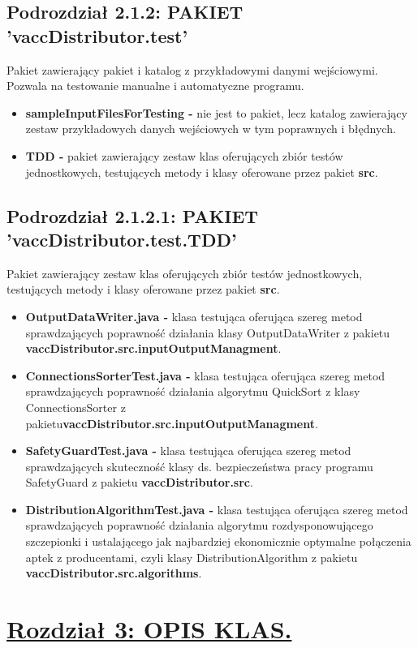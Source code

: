 \documentclass[a4paper]{article}
\begin{document}
\subsection*{Podrozdział 2.1.2: PAKIET 'vaccDistributor.test'}
Pakiet zawierający pakiet i katalog z przykładowymi danymi wejściowymi. Pozwala na testowanie manualne i automatyczne programu.
\begin{itemize}
\item \textbf{sampleInputFilesForTesting -} nie jest to pakiet, lecz katalog zawierający zestaw przykładowych danych wejściowych w tym poprawnych i błędnych.
\item \textbf{TDD -} pakiet zawierający zestaw klas oferujących zbiór testów jednostkowych, testujących metody i klasy oferowane przez pakiet \textbf{src}.
\end{itemize}

\subsection*{Podrozdział 2.1.2.1: PAKIET 'vaccDistributor.test.TDD'}
Pakiet zawierający zestaw klas oferujących zbiór testów jednostkowych, testujących metody i klasy oferowane przez pakiet \textbf{src}.
\begin{itemize}
\item \textbf{OutputDataWriter.java -} klasa testująca oferująca szereg metod sprawdzających poprawność działania klasy OutputDataWriter z pakietu \textbf{vaccDistributor.src.inputOutputManagment}.
\item \textbf{ConnectionsSorterTest.java -} klasa testująca oferująca szereg metod sprawdzających poprawność działania algorytmu QuickSort z klasy ConnectionsSorter z pakietu\newline \textbf{vaccDistributor.src.inputOutputManagment}.
\item \textbf{SafetyGuardTest.java -} klasa testująca oferująca szereg metod sprawdzających skuteczność klasy ds. bezpieczeństwa pracy programu SafetyGuard z pakietu \textbf{vaccDistributor.src}.
\item \textbf{DistributionAlgorithmTest.java -} klasa testująca oferująca szereg metod sprawdzających poprawność działania algorytmu rozdysponowującego szczepionki i ustalającego jak najbardziej ekonomicznie optymalne połączenia aptek z producentami, czyli klasy DistributionAlgorithm z pakietu \textbf{vaccDistributor.src.algorithms}.
\end{itemize}

\section*{\underline{Rozdział 3: OPIS KLAS.}}
\end{document}
